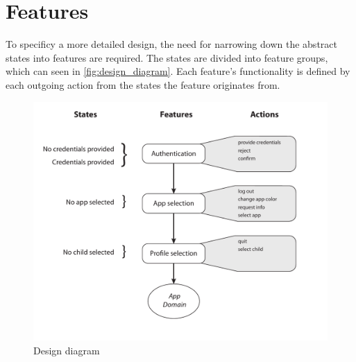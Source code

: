 \section{Features}
To specificy a more detailed design, the need for narrowing down the abstract states into features are required.
The states are divided into feature groups, which can seen in \autoref{fig:design_diagram}.
Each feature's functionality is defined by each outgoing action from the states the feature originates from. 
\begin{figure}[h]
	\centering
	\includegraphics[width=1\textwidth]{gfx/design_diagram.pdf}
	\caption{Design diagram}
	\label{fig:design_diagram}
\end{figure}

